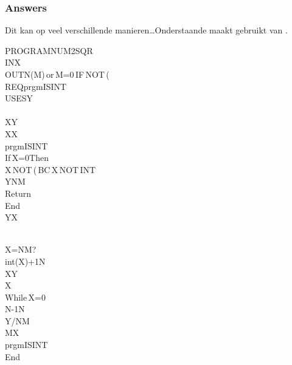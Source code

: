 \begin{frame}
\frametitle{Answers}

Dit kan op veel verschillende manieren\ldots Onderstaande maakt gebruikt van .

\begin{ticalc}
	PROGRAM\:\theta NUM2SQR\\%
	\:\qt IN\:X\\%
	\:\qt OUT\:N\sqrt(M)\,or\,M=0\,IF\,NOT\,\sqrt(\\%
	\:\qt REQ\:prgm\theta ISINT\\%
	\:\qt USES\:Y\\%
	\:\\%
	\:X\>Y\\%
	\:X\sq\>X\\%
	\:prgm\theta ISINT\\%
	\:If\,X=0\:Then\\%
	\:\qt X\,NOT\,\sqrt(\,BC\,X\sq\,NOT\,INT\\%
	\:Y\>N\>M\\%
	\:Return\\%
	\:End\\%
	\:Y\>X
\end{ticalc}
\begin{ticalc}
	\:\\%
	\:\qt X\sq=N\sq M?\\%
	\:int(X)+1\>N\\%
	\:X\sq\>Y\\%
	\>X\\%
	\:While\,X=0\\%
	\:N-1\>N\\%
	\:Y/N\sq\>M\\%
	\:M\>X\\%
	\:prgm\theta ISINT\\%
	\:End
\end{ticalc}

\end{frame}




